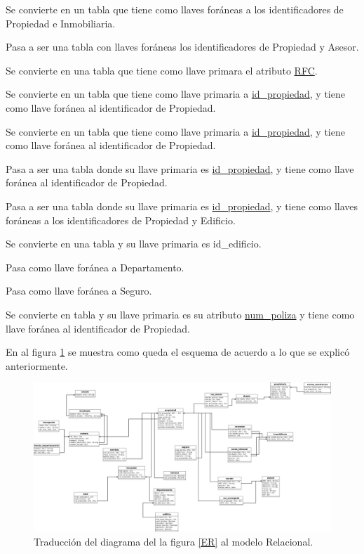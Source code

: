 \documentclass[10pt]{article}
\begin{document}
\begin{description}[leftmargin=9em,style=nextline]
    	\item[Venta historial] Se convierte en un tabla que tiene como llaves foráneas a los identificadores de Propiedad e Inmobiliaria.
    	\item[Ser encargado] Pasa a ser una tabla con llaves foráneas los identificadores de Propiedad y Asesor.
    	\item[Asesor] Se convierte en una tabla que tiene como llave primara el atributo \underline{RFC}.
    	\item[Inmueble] Se convierte en un tabla que tiene como llave primaria a \underline{id\_propiedad}, y tiene como llave foránea al identificador de Propiedad.
    	\item[Terreno] Se convierte en un tabla que tiene como llave primaria a \underline{id\_propiedad}, y tiene como llave foránea al identificador de Propiedad.
    	\item[Casa] Pasa a ser una tabla donde su llave primaria es \underline{id\_propiedad}, y tiene como llave foránea al identificador de Propiedad.
    	\item[Departamento]  Pasa a ser una tabla donde su llave primaria es \underline{id\_propiedad}, y tiene como llaves foráneas a los identificadores de Propiedad y Edificio.
    	\item[Edificio] Se convierte en una tabla y su llave primaria es id\_edificio.
    	\item[Situar] Pasa como llave foránea a Departamento.
    	\item[tener] Pasa como llave foránea a Seguro.
    	\item[Seguro] Se convierte en tabla y su llave primaria es su atributo \underline{num\_poliza} y tiene como llave foránea al identificador de Propiedad.
   \end{description} 	
    
    
    En al figura \ref{MR} se muestra como queda el esquema de acuerdo a lo que se explicó anteriormente.
    \begin{center}
    	\begin{figure}[H]
    		\centering
    		\includegraphics[width=1 \textwidth]{modeloRelacional.jpeg}
    		\caption{Traducción del diagrama del la figura \ref{ER} al modelo Relacional.}
    		\label{MR}
    	\end{figure}
    \end{center}
\end{document}
